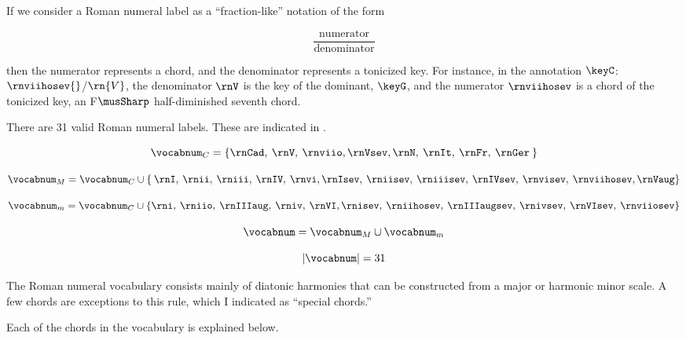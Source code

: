 
If we consider a Roman numeral label as a ``fraction-like''
notation of the form 

\begin{equation}
    \frac{\text{numerator}}{\text{denominator}}
\end{equation}

then the numerator represents a chord, and the denominator
represents a tonicized key. For instance, in the annotation
$\keyC$:$\rnviihosev{}$/$\rn{V}$, the denominator $\rnV$ is
the key of the dominant, $\keyG$, and the numerator
$\rnviihosev$ is a chord of the tonicized key, an
F$\musSharp$ half-diminished seventh chord.

There are 31 valid Roman numeral labels. These are indicated
in .



\begin{equation}
    \vocabnum_{C} = \{ \rnCad, \: \rnV, \: \rnviio,
    \rnVsev, \rnN, \: \rnIt, \: \rnFr, \: \rnGer \: \}
\end{equation}

\begin{equation}
    \vocabnum_{M} = \vocabnum_{C} \cup \{ \: \rnI, \: \rnii, \: 
    \rniii, \: \rnIV, \: \rnvi, \rnIsev, \: \rniisev, \: 
    \rniiisev, \: \rnIVsev, \: \rnvisev, \: \rnviihosev, \rnVaug \}
\end{equation}

\begin{equation}
    \vocabnum_{m} = \vocabnum_{C} \cup  \{ \rni, \: \rniio, \: 
    \rnIIIaug, \: \rniv, \: \rnVI, \rnisev, \: \rniihosev, \: 
    \rnIIIaugsev, \: \rnivsev, \: \rnVIsev, \: \rnviiosev \}
\end{equation}

\begin{equation}
    \vocabnum = \vocabnum_{M} \cup \vocabnum_{m}
\end{equation}

\begin{equation}
    | \vocabnum | = 31
\end{equation}

                

The Roman numeral vocabulary consists mainly of diatonic
harmonies that can be constructed from a major or harmonic
minor scale. A few chords are exceptions to this rule, \:
which I indicated as ``special chords.''

Each of the chords in the vocabulary is explained below.


